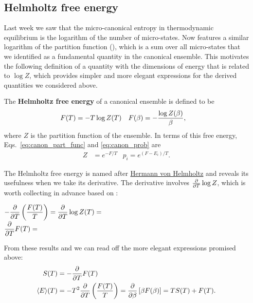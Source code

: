 \subsection{Helmholtz free energy}
Last week we saw that the micro-canonical entropy in thermodynamic equilibrium is the logarithm of the number of micro-states.
Now  features a similar logarithm of the partition function (), which is a sum over all micro-states that we identified as a fundamental quantity in the canonical ensemble.
This motivates the following definition of a quantity with the dimensions of energy that is related to $\log Z$, which provides simpler and more elegant expressions for the derived quantities we considered above.

\begin{shaded}
  The \textbf{Helmholtz free energy} of a canonical ensemble is defined to be
  \begin{align}
    \label{eq:helmholtz}
    F(T) & = -T \log Z(T) &
    F(\beta) & = -\frac{\log Z(\beta)}{\beta},
  \end{align}
  where $Z$ is the partition function of the ensemble.
  In terms of this free energy, Eqs.~\ref{eq:canon_part_func} and \ref{eq:canon_prob} are
  \begin{align*}
    Z & = e^{-F / T} &
    p_i = e^{(F - E_i) / T}.
  \end{align*}
\end{shaded}

\newpage %
The Helmholtz free energy is named after \href{https://en.wikipedia.org/wiki/Hermann_von_Helmholtz}{Hermann von Helmholtz} and reveals its usefulness when we take its derivative.
The derivative involves $\frac{\partial }{\partial T} \log Z$, which is worth collecting in advance based on :
\begin{mdframed}
  $\displaystyle -\frac{\partial }{\partial T}\left(\frac{F(T)}{T}\right) = \frac{\partial }{\partial T} \log Z(T) = $ \\[50 pt]
  $\displaystyle \frac{\partial }{\partial T} F(T) = $ \\[50 pt]
\end{mdframed}
From these results and  we can read off the more elegant expressions promised above:
\begin{align}
  S(T) & = -\frac{\partial }{\partial T} F(T) \label{eq:canon_entropy-F} \\
  \left\langle E \right\rangle\!(T) & = -T^2 \frac{\partial }{\partial T}\left(\frac{F(T)}{T}\right) = \frac{\partial }{\partial \beta}\left[\beta F(\beta)\right] = T S(T) + F(T). \label{eq:canon_energy-F}
\end{align}



